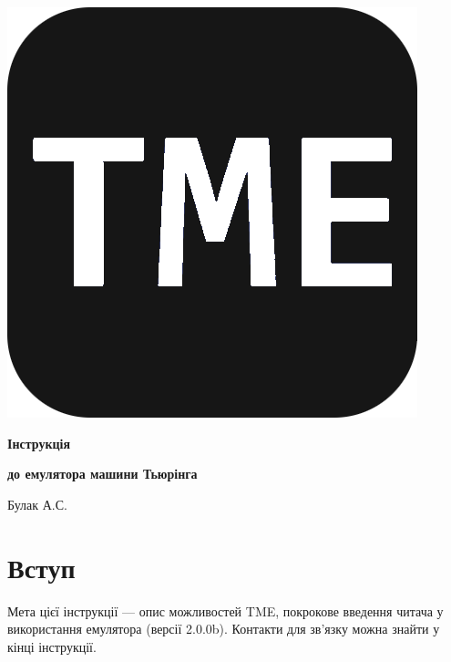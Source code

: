 \documentclass[oneside,final,14pt]{extreport}
\begin{document}
\begin{centering}

\thispagestyle{empty} %
\begin{minipage}[t]{16.75cm}

\begin{center}
\includegraphics[scale=0.1]{0}
\end{center}

\vspace{9cm}

\centerline{\Huge  \bfseries Інструкція}
\centerline{\Large \bfseries до емулятора машини Тьюрінга}

\vspace{11,9cm}

\centerline{Булак А.С.}
\vspace{0,2cm}


\end{minipage}

\end{centering}


\pagebreak
	
\tableofcontents
\pagebreak
\setcounter{page}{2}
	
\chapter*{Вступ}
Мета цієї інструкції --- опис можливостей TME, покрокове введення читача у використання емулятора (версії 2.0.0b). Контакти для зв'язку можна знайти у кінці інструкції.
\end{document}
